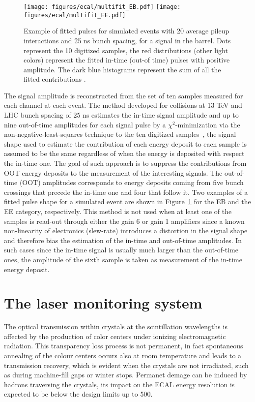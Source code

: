 \begin{figure}[!h]
  \centering
  \texttt{[image: figures/ecal/multifit\_EB.pdf]}
  \texttt{[image: figures/ecal/multifit\_EE.pdf]}
  \caption{Example of fitted pulses for simulated events with 20 average pileup interactions and 25 ns bunch spacing, for a signal in the barrel. Dots represent the 10 digitized samples, the red distributions (other light colors) represent the fitted in-time (out-of time) pulses with positive amplitude. The dark blue histograms represent the sum of all the fitted contributions \cite{Multifit}.}
  \label{fig:multifit_for_dummies}
\end{figure}

The signal amplitude is reconstructed from the set of ten samples measured for each channel at each event.
The method developed for collisions at 13 TeV and LHC bunch spacing of 25 ns estimates
the in-time signal amplitude and up to nine out-of-time
amplitudes for each signal pulse by a $\chi^2$-minimization via the non-negative-least-squares
technique to the ten digitized samples~\cite{Multifit}, the signal shape used to estimate the contribution of each
energy deposit to each sample is assumed to be the same regardless of when the energy is deposited with respect
the in-time one.
The goal of such approach is to suppress the contributions from OOT energy deposits
to the measurement of the interesting signals.
The out-of-time (OOT) amplitudes corresponds to
energy deposits coming from five bunch crossings that precede the in-time one and four that follow it.
Two examples of a fitted pulse shape for
a simulated event are shown in Figure~\ref{fig:multifit_for_dummies} for the EB and the EE category, respectively.
This method is not used when at least one of the samples is read-out through either the gain 6 or gain 1
amplifiers since a known non-linearity of electronics (slew-rate) introduces a distortion in the signal shape
and therefore bias the estimation of the in-time and out-of-time amplitudes.
In such cases since the in-time signal is usually much larger than the out-of-time ones,
the amplitude of the sixth sample is taken as measurement of the in-time energy deposit.

\section{The laser monitoring system}
The optical transmission within crystals at the scintillation wavelengths is affected by the production
of color centers under ionizing electromagnetic radiation. This transparency loss process is not permanent,
in fact spontaneous annealing of the colour centers occurs also at room temperature and leads
to a transmission recovery, which is evident when the crystals are not irradiated, such as during
machine-fill gaps or winter stops.
Permanet demage can be induced by hadrons traversing the crystals, its impact on the ECAL energy resolution
is expected to be below the design limits up to 500\fbinv.

